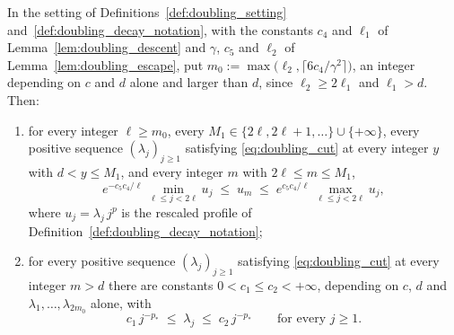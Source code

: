 \begin{theorem}\label{theo:doubling_decay}
In the setting of Definitions~\ref{def:doubling_setting} and~\ref{def:doubling_decay_notation},
with the constants $c_4$ and $\ell_1$ of Lemma~\ref{lem:doubling_descent} and $\gamma$, $c_5$
and $\ell_2$ of Lemma~\ref{lem:doubling_escape}, put
$m_0:=\max\bigl(\ell_2,\lceil6c_4/\gamma^2\rceil\bigr)$, an integer depending on $c$ and $d$
alone and larger than $d$, since $\ell_2\geq2\ell_1$ and $\ell_1>d$. Then:
\begin{enumerate}
    \item for every integer $\ell\geq m_0$, every
    $M_1\in\{2\ell,2\ell+1,\dots\}\cup\{+\infty\}$, every positive sequence
    $(\lambda_j)_{j\geq1}$ satisfying \eqref{eq:doubling_cut} at every integer $y$ with
    $d<y\leq M_1$, and every integer $m$ with $2\ell\leq m\leq M_1$,
    \begin{equation}\label{eq:doubling_block}
        e^{-c_5c_4/\ell}\,\min_{\ell\leq j<2\ell}u_j\;\leq\;u_m\;\leq\;
        e^{c_5c_4/\ell}\,\max_{\ell\leq j<2\ell}u_j ,
    \end{equation}
    where $u_j=\lambda_j\,j^{p}$ is the rescaled profile of
    Definition~\ref{def:doubling_decay_notation};
    \item for every positive sequence $(\lambda_j)_{j\geq1}$ satisfying \eqref{eq:doubling_cut}
    at every integer $m>d$ there are constants $0<c_1\leq c_2<+\infty$, depending on $c$, $d$
    and $\lambda_1,\dots,\lambda_{2m_0}$ alone, with
    \begin{equation}\label{eq:doubling_decay}
        c_1\,j^{-p_*}\;\leq\;\lambda_j\;\leq\;c_2\,j^{-p_*}\qquad\text{for every }j\geq1 .
    \end{equation}
\end{enumerate}
\end{theorem}

